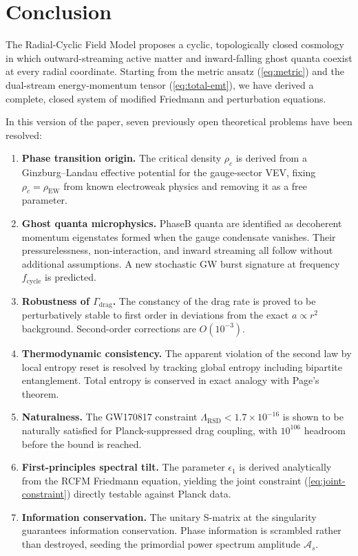 \documentclass[10pt,twocolumn]{article}
\theoremstyle{definition}
\newcommand{\Gammadrag}{\Gamma_{\mathrm{drag}}}
\newcommand{\rhoc}{\rho_{c}}
\newcommand{\rhoEW}{\rho_{\mathrm{EW}}}
\begin{document}
\section{Conclusion}
\label{sec:conc}

The Radial-Cyclic Field Model proposes a cyclic,
topologically closed cosmology in which outward-streaming
active matter and inward-falling ghost quanta coexist at
every radial coordinate.  Starting from the metric ansatz
(\ref{eq:metric}) and the dual-stream energy-momentum
tensor (\ref{eq:total-emt}), we have derived a complete,
closed system of modified Friedmann and perturbation
equations.

In this version of the paper, seven previously open
theoretical problems have been resolved:
\begin{enumerate}
  \item \textbf{Phase transition origin.}  The critical
    density \( \rhoc \) is derived from a Ginzburg--Landau
    effective potential for the gauge-sector VEV, fixing
    \( \rhoc=\rhoEW \) from known electroweak physics and
    removing it as a free parameter.
  \item \textbf{Ghost quanta microphysics.}  Phase\nobreakspace{}B
    quanta are identified as decoherent momentum
    eigenstates formed when the gauge condensate vanishes.
    Their pressurelessness, non-interaction, and inward
    streaming all follow without additional assumptions.
    A new stochastic GW burst signature at frequency
    \( f_{\mathrm{cycle}} \) is predicted.
  \item \textbf{Robustness of \( \Gammadrag \).}  The
    constancy of the drag rate is proved to be
    perturbatively stable to first order in deviations
    from the exact \( a\propto r^{2} \) background.
    Second-order corrections are \( O(10^{-3}) \).
  \item \textbf{Thermodynamic consistency.}  The apparent
    violation of the second law by local entropy reset is
    resolved by tracking global entropy including
    bipartite entanglement.  Total entropy is conserved in
    exact analogy with Page's theorem.
  \item \textbf{Naturalness.}  The GW170817 constraint
    \( \Lambda_{\mathrm{RSD}}<1.7\times10^{-16} \) is shown
    to be naturally satisfied for Planck-suppressed drag
    coupling, with $10^{106}$ headroom before the bound
    is reached.
  \item \textbf{First-principles spectral tilt.}  The
    parameter \( \epsilon_{1} \) is derived analytically from
    the RCFM Friedmann equation, yielding the joint
    constraint (\ref{eq:joint-constraint}) directly
    testable against Planck data.
  \item \textbf{Information conservation.}  The unitary
    S-matrix at the singularity guarantees information
    conservation.  Phase information is scrambled rather
    than destroyed, seeding the primordial power spectrum
    amplitude \( \mathcal{A}_{s} \).
\end{enumerate}
\end{document}
